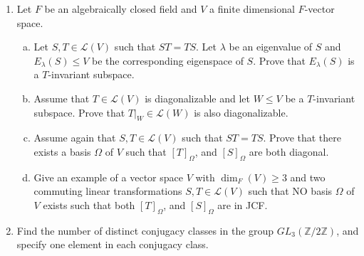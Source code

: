 \documentclass[12pt,
psamsfonts]{amsart}
\theoremstyle{remark}
\theoremstyle{definition}
\newcommand{\Z}{\mathbb{Z}\xspace}
\newcommand{\Q}{\mathbb{Q}\xspace}
\newcommand{\C}{\mathbb{C}\xspace}
\numberwithin{equation}{section}
\begin{document}
\begin{enumerate}
\item Let $F$ be an algebraically closed field and $V$ a finite dimensional $F$-vector space. 
\begin{enumerate}[(a)]
\item  Let $S,T\in\mathcal{L}(V)$ such that $ST=TS$. Let $\lambda$ be an eigenvalue of $S$ and $E_\lambda(S)\leq V$ be the corresponding eigenspace of $S$. Prove that $E_\lambda(S)$ is a $T$-invariant subspace. \\
\item  Assume that $T\in\mathcal{L}(V)$ is diagonalizable and let $W\leq V$ be a $T$-invariant subspace. Prove that $T|_W\in\mathcal{L}(W)$ is also diagonalizable. \\
\item  Assume again that $S,T\in\mathcal{L}(V)$ such that $ST=TS$. Prove that there exists a basis $\Omega$ of $V$ such that $[T]_\Omega$, and $[S]_\Omega$ are both diagonal. \\
\item  Give an example of a vector space $V$ with $\dim_F(V)\geq 3$ and two commuting linear transformations $S,T\in\mathcal{L}(V)$ such that NO basis $\Omega$ of $V$ exists such that both $[T]_\Omega$, and $[S]_\Omega$ are in JCF. 
\end{enumerate}
\medskip
\medskip
\item  Find the number of distinct conjugacy classes in the group $GL_3(\Z/2\Z)$, and specify one element in each conjugacy class. \\


\end{enumerate}
\end{document}
